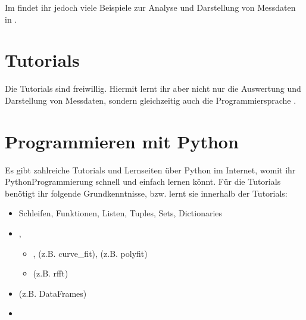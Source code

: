 \documentclass[letterpaper,10pt,english]{jupyterBook}
\begin{document}
\sphinxAtStartPar
Im  findet ihr jedoch viele Beispiele zur Analyse und Darstellung von Messdaten in .


\section{Tutorials}
\label{\detokenize{content/00_jupyter:tutorials}}
\sphinxAtStartPar
Die Tutorials sind freiwillig. Hiermit lernt ihr aber nicht nur die Auswertung und Darstellung von Messdaten, sondern gleichzeitig auch die Programmiersprache .


\section{Programmieren mit Python}
\label{\detokenize{content/00_jupyter:programmieren-mit-python}}
\sphinxAtStartPar
Es gibt zahlreiche Tutorials und Lernseiten über Python im Internet, womit ihr Python\sphinxhyphen{}Programmierung schnell und einfach lernen könnt. Für die Tutorials benötigt ihr folgende Grundkenntnisse, bzw. lernt sie innerhalb der Tutorials:
\begin{itemize}
\item {} 
\sphinxAtStartPar
{} Schleifen, Funktionen, Listen, Tuples, Sets, Dictionaries

\item {} 
\sphinxAtStartPar
{} , 
\begin{itemize}
\item {} 
\sphinxAtStartPar
{} ,  (z.B. curve\_fit),  (z.B. polyfit)

\item {} 
\sphinxAtStartPar
{}  (z.B. rfft)

\end{itemize}

\item {} 
\sphinxAtStartPar
{}  (z.B. DataFrames)

\item {} 
\sphinxAtStartPar
{} 

\end{itemize}
\end{document}
